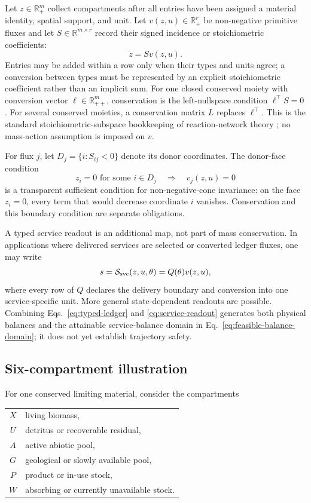 \documentclass[11pt]{article}
\newcommand{\R}{\mathbb R}
\begin{document}
Let $z\in\R_+^m$ collect compartments after all entries have been assigned a material identity, spatial support, and unit. Let $v(z,u)\in\R_+^r$ be non-negative primitive fluxes and let $S\in\R^{m\times r}$ record their signed incidence or stoichiometric coefficients:
\begin{equation}
\dot z=S v(z,u).
\label{eq:typed-ledger}
\end{equation}
Entries may be added within a row only when their types and units agree; a conversion between types must be represented by an explicit stoichiometric coefficient rather than an implicit sum. For one closed conserved moiety with conversion vector $\ell\in\R_{++}^m$, conservation is the left-nullspace condition $\ell^\top S=0$. For several conserved moieties, a conservation matrix $L$ replaces $\ell^\top$. This is the standard stoichiometric-subspace bookkeeping of reaction-network theory \cite{feinberg2019}; no mass-action assumption is imposed on $v$.

For flux $j$, let $D_j=\{i:S_{ij}<0\}$ denote its donor coordinates. The donor-face condition
\[
z_i=0\text{ for some }i\in D_j
\quad\Longrightarrow\quad
v_j(z,u)=0
\]
is a transparent sufficient condition for non-negative-cone invariance: on the face $z_i=0$, every term that would decrease coordinate $i$ vanishes. Conservation and this boundary condition are separate obligations.

A typed service readout is an additional map, not part of mass conservation. In applications where delivered services are selected or converted ledger fluxes, one may write
\begin{equation}
s=\mathcal S_{\rm svc}(z,u,\theta)=Q(\theta)v(z,u),
\label{eq:service-readout}
\end{equation}
where every row of $Q$ declares the delivery boundary and conversion into one service-specific unit. More general state-dependent readouts are possible. Combining Eqs.~\eqref{eq:typed-ledger} and \eqref{eq:service-readout} generates both physical balances and the attainable service-balance domain in Eq.~\eqref{eq:feasible-balance-domain}; it does not yet establish trajectory safety.

\subsection{Six-compartment illustration}

For one conserved limiting material, consider the compartments

\begin{center}
\begin{tabular}{cl}
$X$ & living biomass,\\
$U$ & detritus or recoverable residual,\\
$A$ & active abiotic pool,\\
$G$ & geological or slowly available pool,\\
$P$ & product or in-use stock,\\
$W$ & absorbing or currently unavailable stock.
\end{tabular}
\end{center}
\end{document}

